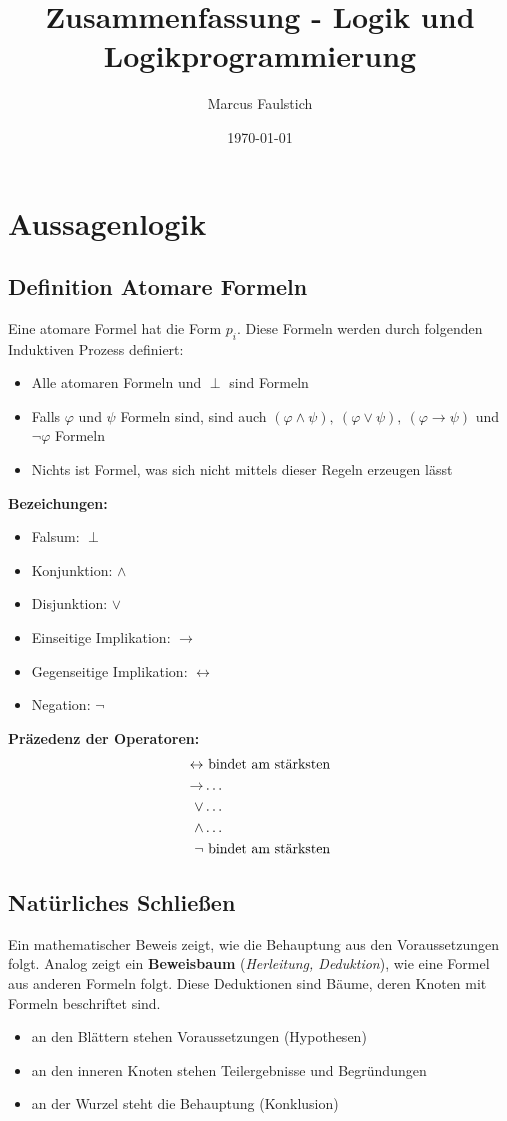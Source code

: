 \documentclass[12pt,a4paper]{report}
\title{Zusammenfassung - Logik und Logikprogrammierung}
\date{\today}
\author{Marcus Faulstich}
\newcommand{\ra}{\rightarrow}
\newcommand{\ls}{\newline\newline}
\newcommand{\logicand}{\wedge}
\newcommand{\logicor}{\vee}
\newcommand{\define}[1]{\section{\blue{Definition #1}}}
\newcommand{\red}[1]{\textcolor[rgb]{0.9,0.2,0.2}{#1}}
\newcommand{\blue}[1]{\textcolor[rgb]{0.2,0.2,1}{#1}}
\begin{document}
\maketitle
\hypertarget{contents}{}
\tableofcontents

\chapter{Aussagenlogik}

\define{Atomare Formeln}
Eine \red{atomare Formel} hat die Form $ p_i $. Diese Formeln werden durch folgenden Induktiven Prozess definiert:
\begin{itemize}
    \item Alle atomaren Formeln und $ \perp $ sind Formeln
    \item Falls $ \varphi $ und $ \psi  $ Formeln sind, sind auch $ (\varphi \logicand \psi),~ (\varphi \logicor \psi),~ (\varphi \ra \psi) $ und $ \lnot \varphi $ Formeln
    \item Nichts ist Formel, was sich nicht mittels dieser Regeln erzeugen lässt
\end{itemize}
\textbf{Bezeichungen: }
\begin{itemize}
    \item Falsum: $ \perp $
    \item Konjunktion: $ \logicand $
    \item Disjunktion: $ \logicor $
    \item Einseitige Implikation: $ \ra $
    \item Gegenseitige Implikation: $ \leftrightarrow $
    \item Negation: $ \lnot $
\end{itemize}
\textbf{Präzedenz der Operatoren:}
\begin{align*}
    \leftrightarrow &~ \textnormal{bindet am stärksten}\\
    \ra & \dots\\\logicor & \dots\\\logicand & \dots\\
    \lnot &~ \textnormal{bindet am stärksten}
\end{align*}

\section{\blue{Natürliches Schließen}}
Ein mathematischer Beweis zeigt, wie die Behauptung aus den Voraussetzungen folgt. Analog zeigt ein \textbf{Beweisbaum} (\textit{Herleitung, Deduktion}), wie eine Formel aus anderen Formeln folgt.
\ls
Diese Deduktionen sind Bäume, deren Knoten mit Formeln beschriftet sind.
\begin{itemize}
    \item an den Blättern stehen Voraussetzungen (\red{Hypothesen})
    \item an den inneren Knoten stehen Teilergebnisse und Begründungen
    \item an der Wurzel steht die Behauptung (\red{Konklusion})
\end{itemize}
\end{document}
